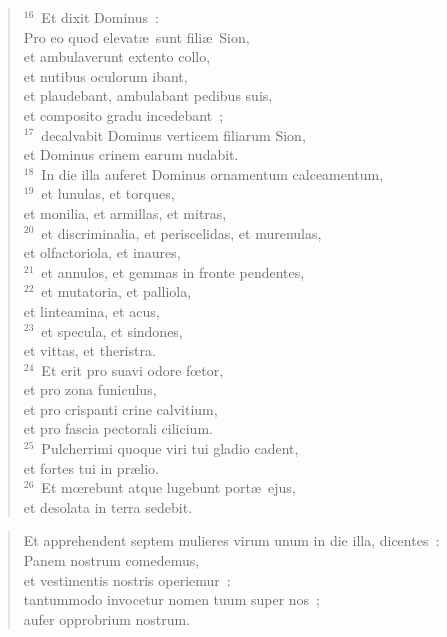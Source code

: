 \begin{flushleft}\begin{verse}${}^{16}$~Et dixit Dominus~:\\ Pro eo quod elevat\ae\ sunt fili\ae\ Sion,\\ et ambulaverunt extento collo,\\ et nutibus oculorum ibant,\\ et plaudebant, ambulabant pedibus suis,\\ et composito gradu incedebant~;\\
${}^{17}$~decalvabit Dominus verticem filiarum Sion,\\ et Dominus crinem earum nudabit.\\
${}^{18}$~In die illa auferet Dominus ornamentum calceamentum,\\
${}^{19}$~et lunulas, et torques,\\ et monilia, et armillas, et mitras,\\
${}^{20}$~et discriminalia, et periscelidas, et murenulas,\\ et olfactoriola, et inaures,\\
${}^{21}$~et annulos, et gemmas in fronte pendentes,\\
${}^{22}$~et mutatoria, et palliola,\\ et linteamina, et acus,\\
${}^{23}$~et specula, et sindones,\\ et vittas, et theristra.\\
${}^{24}$~Et erit pro suavi odore fœtor,\\ et pro zona funiculus,\\ et pro crispanti crine calvitium,\\ et pro fascia pectorali cilicium.\\
${}^{25}$~Pulcherrimi quoque viri tui gladio cadent,\\ et fortes tui in pr\ae lio.\\
${}^{26}$~Et mœrebunt atque lugebunt port\ae\ ejus,\\ et desolata in terra sedebit.\end{verse}\end{flushleft}


\begin{flushleft}\begin{verse}\vspace{-19pt}Et apprehendent septem mulieres virum unum in die illa, dicentes~:\\ Panem nostrum comedemus,\\ et vestimentis nostris operiemur~:\\ tantummodo invocetur nomen tuum super nos~;\\ aufer opprobrium nostrum.\end{verse}\end{flushleft}


